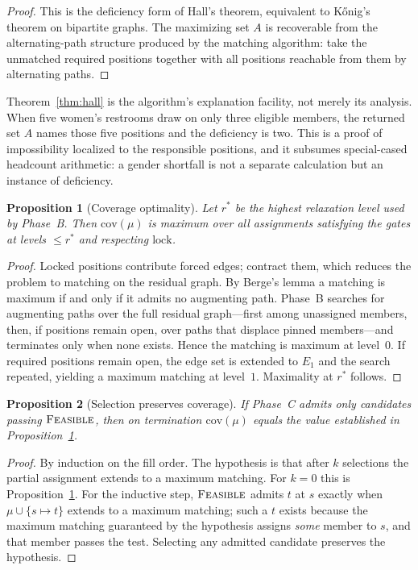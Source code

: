 \documentclass[11pt,a4paper]{article}
\newtheorem{proposition}{Proposition}
\theoremstyle{definition}
\theoremstyle{remark}
\begin{document}
\begin{proof}
This is the deficiency form of Hall's theorem, equivalent to
K\H{o}nig's theorem on bipartite graphs. The maximizing set $A$ is
recoverable from the alternating-path structure produced by the matching
algorithm: take the unmatched required positions together with all positions
reachable from them by alternating paths.
\end{proof}

Theorem~\ref{thm:hall} is the algorithm's explanation facility, not merely
its analysis. When five women's restrooms draw on only three eligible
members, the returned set $A$ names those five positions and the deficiency
is two. This is a proof of impossibility localized to the responsible
positions, and it subsumes special-cased headcount arithmetic: a gender
shortfall is not a separate calculation but an instance of deficiency.

\begin{proposition}[Coverage optimality]
\label{prop:cov}
Let $r^{*}$ be the highest relaxation level used by Phase~B. Then
$\mathrm{cov}(\mu)$ is maximum over all assignments satisfying the gates at
levels $\leq r^{*}$ and respecting $\mathrm{lock}$.
\end{proposition}

\begin{proof}
Locked positions contribute forced edges; contract them, which reduces the
problem to matching on the residual graph. By Berge's lemma a matching is
maximum if and only if it admits no augmenting path. Phase~B searches for
augmenting paths over the full residual graph---first among unassigned
members, then, if positions remain open, over paths that displace pinned
members---and terminates only when none exists. Hence the matching is
maximum at level~$0$. If required positions remain open, the edge set is
extended to $E_1$ and the search repeated, yielding a maximum matching at
level~$1$. Maximality at $r^{*}$ follows.
\end{proof}

\begin{proposition}[Selection preserves coverage]
\label{prop:oracle}
If Phase~C admits only candidates passing $\textsc{Feasible}$, then on
termination $\mathrm{cov}(\mu)$ equals the value established in
Proposition~\ref{prop:cov}.
\end{proposition}

\begin{proof}
By induction on the fill order. The hypothesis is that after $k$ selections
the partial assignment extends to a maximum matching. For $k = 0$ this is
Proposition~\ref{prop:cov}. For the inductive step, $\textsc{Feasible}$
admits $t$ at $s$ exactly when $\mu \cup \{s \mapsto t\}$ extends to a
maximum matching; such a $t$ exists because the maximum matching guaranteed
by the hypothesis assigns \emph{some} member to $s$, and that member passes
the test. Selecting any admitted candidate preserves the hypothesis.
\end{proof}
\end{document}
